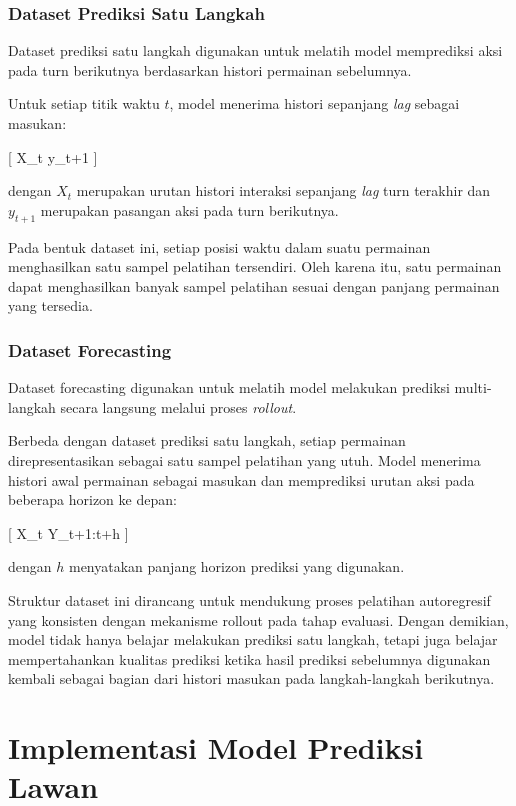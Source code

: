\subsubsection{Dataset Prediksi Satu Langkah}

Dataset prediksi satu langkah digunakan untuk melatih model memprediksi aksi pada turn berikutnya berdasarkan histori permainan sebelumnya.

Untuk setiap titik waktu $t$, model menerima histori sepanjang \textit{lag} sebagai masukan:

[
X_t \rightarrow y_{t+1}
]

dengan $X_t$ merupakan urutan histori interaksi sepanjang \textit{lag} turn terakhir dan $y_{t+1}$ merupakan pasangan aksi pada turn berikutnya.

Pada bentuk dataset ini, setiap posisi waktu dalam suatu permainan menghasilkan satu sampel pelatihan tersendiri. Oleh karena itu, satu permainan dapat menghasilkan banyak sampel pelatihan sesuai dengan panjang permainan yang tersedia.

\subsubsection{Dataset Forecasting}

Dataset forecasting digunakan untuk melatih model melakukan prediksi multi-langkah secara langsung melalui proses \textit{rollout}.

Berbeda dengan dataset prediksi satu langkah, setiap permainan direpresentasikan sebagai satu sampel pelatihan yang utuh. Model menerima histori awal permainan sebagai masukan dan memprediksi urutan aksi pada beberapa horizon ke depan:

[
X_t \rightarrow Y_{t+1:t+h}
]

dengan $h$ menyatakan panjang horizon prediksi yang digunakan.

Struktur dataset ini dirancang untuk mendukung proses pelatihan autoregresif yang konsisten dengan mekanisme rollout pada tahap evaluasi. Dengan demikian, model tidak hanya belajar melakukan prediksi satu langkah, tetapi juga belajar mempertahankan kualitas prediksi ketika hasil prediksi sebelumnya digunakan kembali sebagai bagian dari histori masukan pada langkah-langkah berikutnya.


\section{Implementasi Model Prediksi Lawan}

